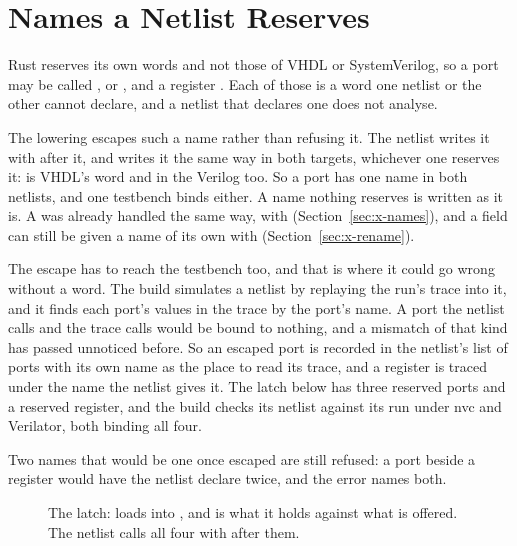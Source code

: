 \section{Names a Netlist Reserves}
\label{sec:x-reserved}

Rust reserves its own words and not those of VHDL or SystemVerilog, so
a port may be called ,  or , and a
register . Each of those is a word one netlist or the
other cannot declare, and a netlist that declares one does not
analyse.

The lowering escapes such a name rather than refusing it. The netlist
writes it with  after it, and writes it the same way in
both targets, whichever one reserves it:  is VHDL's word
and  in the Verilog too. So a port has one name in
both netlists, and one testbench binds either. A name nothing
reserves is written as it is. A  was already handled the
same way, with  (Section~\ref{sec:x-names}), and a field can
still be given a name of its own with \code{\#[rename]}
(Section~\ref{sec:x-rename}).

The escape has to reach the testbench too, and that is where it could
go wrong without a word. The build simulates a netlist by replaying
the run's trace into it, and it finds each port's values in the trace
by the port's name. A port the netlist calls  and the
trace calls  would be bound to nothing, and a mismatch of
that kind has passed unnoticed before. So an escaped port is recorded
in the netlist's list of ports with its own name as the place to read
its trace, and a register is traced under the name the netlist gives
it. The latch below has three reserved ports and a reserved register,
and the build checks its netlist against its run under nvc and
Verilator, both binding all four.

Two names that would be one once escaped are still refused: a port
 beside a register  would have the netlist
declare  twice, and the error names both.

\begin{figure}[htbp]
\centering

\caption{The latch:  loads  into
, and  is what it holds against what is
offered. The netlist calls all four with  after them.}
\label{fig:x-reserved}
\end{figure}




